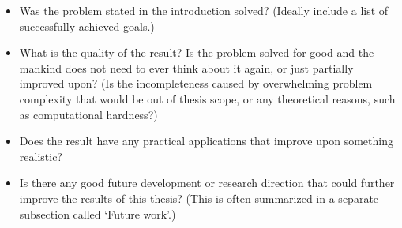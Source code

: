 

\begin{itemize}
\item Was the problem stated in the introduction solved? (Ideally include a list of successfully achieved goals.)
\item What is the quality of the result?
Is the problem solved for good and the mankind does not need to ever think about it again, or just partially improved upon? (Is the incompleteness caused by overwhelming problem complexity that would be out of thesis scope, or any theoretical reasons, such as computational hardness?)
\item Does the result have any practical applications that improve upon something realistic?
\item Is there any good future development or research direction that could further improve the results of this thesis? (This is often summarized in a separate subsection called `Future work'.)
\end{itemize}
